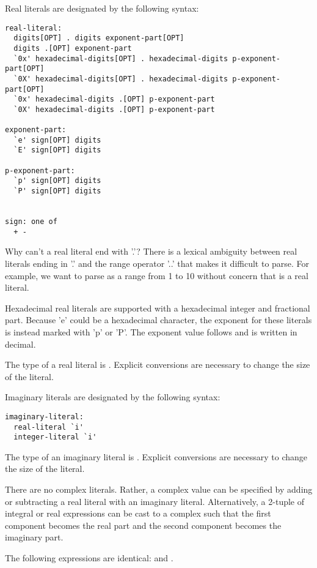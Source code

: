 Real literals are designated by the following syntax:
\begin{syntax}
\begin{verbatim}
real-literal:
  digits[OPT] . digits exponent-part[OPT]
  digits .[OPT] exponent-part
  `0x' hexadecimal-digits[OPT] . hexadecimal-digits p-exponent-part[OPT]
  `0X' hexadecimal-digits[OPT] . hexadecimal-digits p-exponent-part[OPT]
  `0x' hexadecimal-digits .[OPT] p-exponent-part
  `0X' hexadecimal-digits .[OPT] p-exponent-part

exponent-part:
  `e' sign[OPT] digits
  `E' sign[OPT] digits

p-exponent-part:
  `p' sign[OPT] digits
  `P' sign[OPT] digits


sign: one of
  + -
\end{verbatim}
\end{syntax}

\begin{rationale}
Why can't a real literal end with '.'?  There is a lexical ambiguity
between real literals ending in '.' and the range operator '..' that
makes it difficult to parse.  For example, we want to
parse  as a range from 1 to 10 without concern
that  is a real literal.
\end{rationale}

Hexadecimal real literals are supported with a hexadecimal integer and
fractional part. Because 'e' could be a hexadecimal character, the exponent for
these literals is instead marked with 'p' or 'P'. The exponent value follows
and is written in decimal.

The type of a real literal is .  Explicit conversions are
necessary to change the size of the literal.

Imaginary literals are designated by the following syntax:

\begin{syntax}
\begin{verbatim}
imaginary-literal:
  real-literal `i'
  integer-literal `i'
\end{verbatim}
\end{syntax}

The type of an imaginary literal is .  Explicit conversions
are necessary to change the size of the literal.

There are no complex literals.  Rather, a complex value can be
specified by adding or subtracting a real literal with an imaginary
literal.  Alternatively, a 2-tuple of integral or real expressions can
be cast to a complex such that the first component becomes the real
part and the second component becomes the imaginary part.
\begin{example}
The following expressions are identical: 
and .
\end{example}

